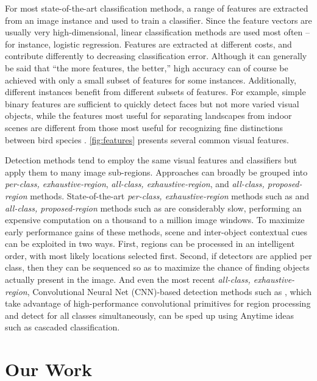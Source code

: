 For most state-of-the-art classification methods, a range of features are extracted from an image instance and used to train a classifier.
Since the feature vectors are usually very high-dimensional, linear classification methods are used most often -- for instance, logistic regression.
Features are extracted at different costs, and contribute differently to decreasing classification error.
Although it can generally be said that ``the more features, the better,'' high accuracy can of course be achieved with only a small subset of features for some instances.
Additionally, different instances benefit from different subsets of features.
For example, simple binary features are sufficient to quickly detect faces \parencite{Viola-IJCV-2004} but not more varied visual objects, while the features most useful for separating landscapes from indoor scenes \parencite{Xiao-CVPR-2010} are different from those most useful for recognizing fine distinctions between bird species \parencite{Farrell-ICCV-2011}.
\autoref{fig:features} presents several common visual features.

Detection methods tend to employ the same visual features and classifiers but apply them to many image sub-regions.
Approaches can broadly be grouped into \emph{per-class, exhaustive-region}, \emph{all-class, exhaustive-region}, and \emph{all-class, proposed-region} methods.
State-of-the-art \emph{per-class, exhaustive-region} methods such as \cite{Felzenszwalb2010a} and \emph{all-class, proposed-region} methods such as \cite{Girshick-CVPR-2014} are considerably slow, performing an expensive computation on a thousand to a million image windows.
To maximize early performance gains of these methods, scene and inter-object contextual cues can be exploited in two ways.
First, regions can be processed in an intelligent order, with most likely locations selected first.
Second, if detectors are applied per class, then they can be sequenced so as to maximize the chance of finding objects actually present in the image.
And even the most recent \emph{all-class, exhaustive-region}, Convolutional Neural Net (CNN)-based detection methods such as \cite{He-ECCV-2014}, which take advantage of high-performance convolutional primitives for region processing and detect for all classes simultaneously, can be sped up using Anytime ideas such as cascaded classification.

\section{Our Work}

